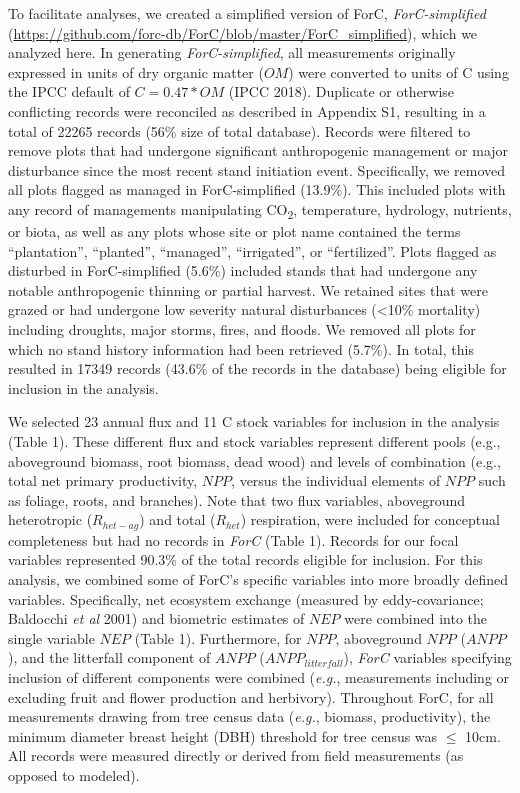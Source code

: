 \documentclass[
]{article}
\begin{document}
To facilitate analyses, we created a simplified version of ForC,
\emph{ForC-simplified}
(\url{https://github.com/forc-db/ForC/blob/master/ForC_simplified}),
which we analyzed here. In generating \emph{ForC-simplified}, all
measurements originally expressed in units of dry organic matter
(\(OM\)) were converted to units of C using the IPCC default of
\(C = 0.47 * OM\) (IPCC 2018). Duplicate or otherwise conflicting
records were reconciled as described in Appendix S1, resulting in a
total of 22265 records (56\% size of total database). Records were
filtered to remove plots that had undergone significant anthropogenic
management or major disturbance since the most recent stand initiation
event. Specifically, we removed all plots flagged as managed in
ForC-simplified (13.9\%). This included plots with any record of
managements manipulating CO\textsubscript{2}, temperature, hydrology,
nutrients, or biota, as well as any plots whose site or plot name
contained the terms ``plantation'', ``planted'', ``managed'',
``irrigated'', or ``fertilized''. Plots flagged as disturbed in
ForC-simplified (5.6\%) included stands that had undergone any notable
anthropogenic thinning or partial harvest. We retained sites that were
grazed or had undergone low severity natural disturbances (\textless10\%
mortality) including droughts, major storms, fires, and floods. We
removed all plots for which no stand history information had been
retrieved (5.7\%). In total, this resulted in 17349 records (43.6\% of
the records in the database) being eligible for inclusion in the
analysis.

We selected 23 annual flux and 11 C stock variables for inclusion in the
analysis (Table 1). These different flux and stock variables represent
different pools (e.g., aboveground biomass, root biomass, dead wood) and
levels of combination (e.g., total net primary productivity, \(NPP\),
versus the individual elements of \(NPP\) such as foliage, roots, and
branches). Note that two flux variables, aboveground heterotropic
(\(R_{het-ag}\)) and total (\(R_{het}\)) respiration, were included for
conceptual completeness but had no records in \emph{ForC} (Table 1).
Records for our focal variables represented 90.3\% of the total records
eligible for inclusion. For this analysis, we combined some of ForC's
specific variables into more broadly defined variables. Specifically,
net ecosystem exchange (measured by eddy-covariance; Baldocchi \emph{et
al} 2001) and biometric estimates of \(NEP\) were combined into the
single variable \(NEP\) (Table 1). Furthermore, for \(NPP\), aboveground
\(NPP\) (\(ANPP\)), and the litterfall component of \(ANPP\)
(\(ANPP_{litterfall}\)), \emph{ForC} variables specifying inclusion of
different components were combined (\emph{e.g.}, measurements including
or excluding fruit and flower production and herbivory). Throughout
ForC, for all measurements drawing from tree census data (\emph{e.g.},
biomass, productivity), the minimum diameter breast height (DBH)
threshold for tree census was \(\le\) 10cm. All records were measured
directly or derived from field measurements (as opposed to modeled).
\end{document}
